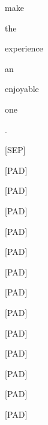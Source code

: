 \documentclass[varwidth=150mm]{standalone}
\begin{document}
\begin{CJK*}{UTF8}{gbsn}
{{{\colorbox{red!8.129721641540527}{\strut make} \colorbox{red!5.315007209777832}{\strut the} \colorbox{red!2.7773661613464355}{\strut experience} \colorbox{red!5.166609764099121}{\strut an} \colorbox{red!11.94241714477539}{\strut enjoyable} \colorbox{red!0.0}{\strut one} \colorbox{red!4.940176486968994}{\strut .} \colorbox{red!4.963362693786621}{\strut [SEP]} \colorbox{red!0.0}{\strut [PAD]} \colorbox{red!0.0}{\strut [PAD]} \colorbox{red!0.0}{\strut [PAD]} \colorbox{red!0.0}{\strut [PAD]} \colorbox{red!0.0}{\strut [PAD]} \colorbox{red!0.0}{\strut [PAD]} \colorbox{red!0.0}{\strut [PAD]} \colorbox{red!0.0}{\strut [PAD]} \colorbox{red!0.0}{\strut [PAD]} \colorbox{red!0.0}{\strut [PAD]} \colorbox{red!0.0}{\strut [PAD]} \colorbox{red!0.0}{\strut [PAD]} \colorbox{red!0.0}{\strut [PAD]}
}}}
\end{CJK*}
\end{document}
